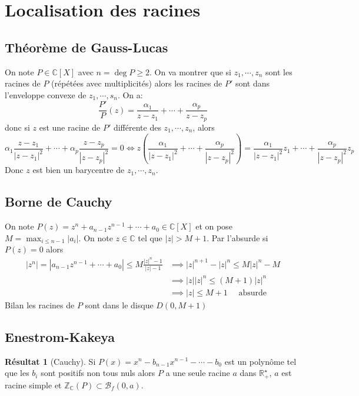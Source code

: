 \documentclass{article}
\theoremstyle{definition}
\newtheorem*{res}{Résultat}
\begin{document}
\section{Localisation des racines}

\subsection{Théorème de Gauss-Lucas}

On note $P\in\mathbb C[X]$ avec $n=\deg P\geq 2$. On va montrer que si $z_1, \cdots, z_n$ sont les racines de $P$ (répétées avec multiplicités) alors les racines de $P'$ sont dans l'enveloppe convexe de $z_1, \cdots, s_n$. On a:
\[
    \frac{P'}P(z)=\frac{\alpha_1}{z-z_1}+\cdots +\frac{\alpha_p}{z-z_p}
\]
donc si $z$ est une racine de $P'$ différente des $z_1, \cdots, z_n$, alors \[
    \alpha_1\frac{z-z_1}{|z-z_1|^2}+\cdots+\alpha_p\frac{z-z_p}{|z-z_p|^2}=0 \iff z \left( \frac{\alpha_1}{|z-z_1|^2}+\cdots+\frac{\alpha_p}{|z-z_p|^2} \right)=\frac{\alpha_1}{|z-z_1|^2}z_1+\cdots+\frac{\alpha_p}{|z-z_p|^2}z_p
\]
Donc $z$ est bien un barycentre de $z_1, \cdots, z_n$.

\subsection{Borne de Cauchy}

On note $P(z)=z^n+a_{n-1}z^{n-1}+\cdots+a_0\in\mathbb C[X]$ et on pose $M=\max_{i\leq n-1}\limits |a_i|$. On note $z\in\mathbb C$ tel que $|z|>M+1$. Par l'absurde si $P(z)=0$ alors \begin{align*}
    |z^n|=|a_{n-1}z^{n-1}+\cdots +a_0|\leq M\frac{|z|^n-1}{|z|-1} &\implies |z|^{n+1}-|z|^n\leq M|z|^n-M \\ &\implies |z| |z|^n\leq (M+1)|z|^n \\ &\implies |z|\leq M+1\quad\text{ absurde }
\end{align*}
Bilan les racines de $P$ sont dans le disque $D(0, M+1)$

\subsection{Enestrom-Kakeya}

\begin{res}[Cauchy]
    Si $P(x)=x^n-b_{n-1}x^{n-1}-\cdots -b_0$ est un polynôme tel que les $b_i$ sont positifs non tous nuls alors $P$ a une seule racine $a$ dans $\mathbb R_+^\star$, $a$ est racine simple et $\mathbb Z_{\mathbb C}(P)\subset \mathcal B_f(0, a)$.
\end{res}
\end{document}
